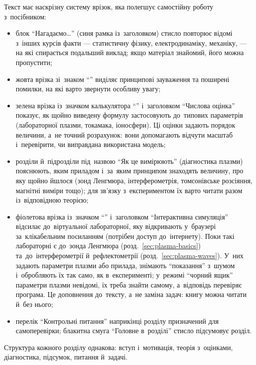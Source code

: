 Текст має наскрізну систему врізок, яка полегшує самостійну роботу з~посібником:
\begin{itemize}
	\item блок \enquote{Нагадаємо\dots} (синя рамка із~заголовком) стисло повторює відомі з~інших курсів факти
	      --- статистичну фізику, електродинаміку, механіку, --- на які спирається подальший виклад; якщо
	      матеріал знайомий, його можна пропустити;
	\item жовта врізка зі~знаком \enquote{\faExclamation} виділяє принципові зауваження та поширені помилки, на які
	      варто звернути особливу увагу;
	\item зелена врізка із~значком калькулятора \enquote{\faCalculator} і~заголовком \enquote{Числова оцінка}
	      показує, як щойно виведену формулу застосовують до~типових параметрів (лабораторної плазми, токамака,
	      іоносфери). Ці оцінки задають порядок величини, а~не точний розрахунок: вони допомагають відчути масштаб
	      і~перевірити, чи виправдана використана модель;
	\item розділи й~підрозділи під~назвою \enquote{Як це вимірюють} (діагностика плазми) пояснюють, яким
	      приладом і~за~яким принципом знаходять величину, про яку щойно йшлося (зонд Ленгмюра, інтерферометрія,
	      томсонівське розсіяння, магнітні виміри тощо); для зв'язку з~експериментом їх варто читати
	      разом із~відповідною теорією;
	\item фіолетова врізка із~значком \enquote{\faPlayCircle} і~заголовком \enquote{Інтерактивна симуляція}
	      відсилає до~віртуальної лабораторної, яку відкривають у~браузері за~клікабельним посиланням
	      (потрібен доступ до~інтернету). Поки такі лабораторні є до~зонда Ленгмюра
	      (розд.~\ref{sec:plasma-basics}) та~до~інтерферометрії й~рефлектометрії (розд.~\ref{sec:plasma-waves}).
	      У~них задають параметри плазми або прилада, знімають \enquote{показання} з~шумом і~обробляють їх так само,
	      як в~експерименті; у~режимі \enquote{чорний ящик} параметри плазми невідомі, їх треба знайти самому,
	      а~відповідь перевіряє програма. Це доповнення до~тексту, а~не заміна задач: книгу можна читати
	      й~без нього;
	\item перелік \enquote{Контрольні питання} наприкінці розділу призначений для самоперевірки;
	      блакитна смуга \enquote{Головне в~розділі} стисло підсумовує розділ.
\end{itemize}
Структура кожного розділу однакова: вступ і~мотивація, теорія з~оцінками, діагностика, підсумок, питання й~задачі.

